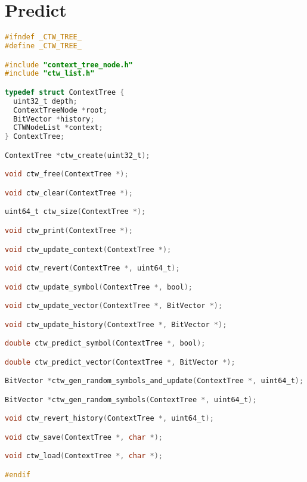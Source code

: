 \documentclass[fancychapters]{report}   	%
\begin{document}
\section{Predict}
\begin{lstlisting}[language=C,caption={context_tree.h}]
#ifndef _CTW_TREE_
#define _CTW_TREE_

#include "context_tree_node.h"
#include "ctw_list.h"

typedef struct ContextTree {
  uint32_t depth;
  ContextTreeNode *root;
  BitVector *history;
  CTWNodeList *context;
} ContextTree;

ContextTree *ctw_create(uint32_t);

void ctw_free(ContextTree *);

void ctw_clear(ContextTree *);

uint64_t ctw_size(ContextTree *);

void ctw_print(ContextTree *);

void ctw_update_context(ContextTree *);

void ctw_revert(ContextTree *, uint64_t);

void ctw_update_symbol(ContextTree *, bool);

void ctw_update_vector(ContextTree *, BitVector *);

void ctw_update_history(ContextTree *, BitVector *);

double ctw_predict_symbol(ContextTree *, bool);

double ctw_predict_vector(ContextTree *, BitVector *);

BitVector *ctw_gen_random_symbols_and_update(ContextTree *, uint64_t);

BitVector *ctw_gen_random_symbols(ContextTree *, uint64_t);

void ctw_revert_history(ContextTree *, uint64_t);

void ctw_save(ContextTree *, char *);

void ctw_load(ContextTree *, char *);

#endif
\end{lstlisting}
\end{document}
